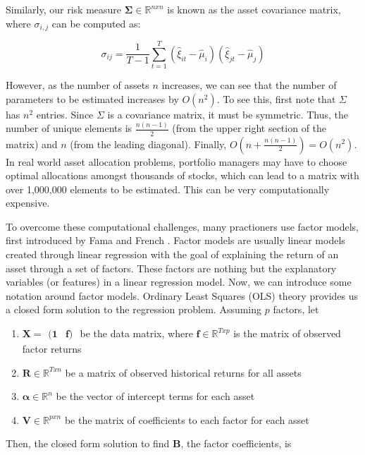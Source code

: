 \documentclass[12pt]{article}
\newcommand{\irow}[1]{%
  \begin{smallmatrix}(#1)\end{smallmatrix}%
}
\begin{document}
Similarly, our risk measure $\boldsymbol{\Sigma} \in \mathbb{R}^{nxn}$ is known as the asset covariance matrix, where $\sigma_{i,j}$ can be computed as:

\begin{equation}
\sigma_{ij} = \frac{1}{T-1} \sum_{t=1}^T (\hat{\xi}_{it} - \hat{\mu}_i)(\hat{\xi}_{jt} - \hat{\mu}_j)
\end{equation}

However, as the number of assets $n$ increases, we can see that the number of parameters to be estimated increases by $O(n^2)$. To see this, first note that $\Sigma$ has $n^2$ entries. Since $\Sigma$ is a covariance matrix, it must be symmetric. Thus, the number of unique elements is $\frac{n(n-1)}{2}$ (from the upper right section of the matrix) and $n$ (from the leading diagonal).  Finally, $O(n + \frac{n(n-1)}{2}) = O(n^2)$. In real world asset allocation problems, portfolio managers may have to choose optimal allocations amongst thousands of stocks,  which can lead to a matrix with over 1,000,000 elements to be estimated. This can be very computationally expensive.

To overcome these computational challenges, many practioners use factor models, first introduced by Fama and French \cite{famafrench1993}.  Factor models are usually linear models created through linear regression with the goal of explaining the return of an asset through a set of factors. These factors are nothing but the explanatory variables (or features) in a linear regression model. Now, we can introduce some notation around factor models.  Ordinary Least Squares (OLS) theory provides us a closed form solution to the regression problem. Assuming $p$ factors,  let
\begin{enumerate}
\item $\boldsymbol{X} = \irow{\boldsymbol{1} & \boldsymbol{f}}$ be the data matrix, where $\boldsymbol{f} \in \mathbb{R}^{Txp}$ is the matrix of observed factor returns
\item $\boldsymbol{R} \in \mathbb{R}^{Txn}$ be a matrix of observed historical returns for all assets
\item $\boldsymbol{\alpha} \in \mathbb{R}^n$ be the vector of intercept terms for each asset
\item $\boldsymbol{V} \in \mathbb{R}^{pxn}$ be the matrix of coefficients to each factor for each asset
\end{enumerate}

Then, the closed form solution to find $\boldsymbol{B}$, the factor coefficients, is
\end{document}
